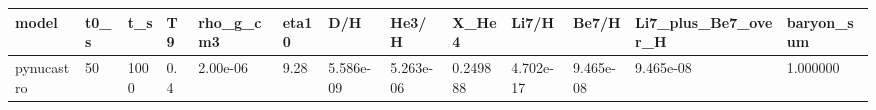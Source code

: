 \begin{tabular}{lllllllllllll}
\toprule
model & t0_s & t_s & T9 & rho_g_cm3 & eta10 & D/H & He3/H & X_He4 & Li7/H & Be7/H & Li7_plus_Be7_over_H & baryon_sum \\
\midrule
pynucastro & 50 & 1000 & 0.4 & 2.00e-06 & 9.28 & 5.586e-09 & 5.263e-06 & 0.249888 & 4.702e-17 & 9.465e-08 & 9.465e-08 & 1.000000 \\
\bottomrule
\end{tabular}
